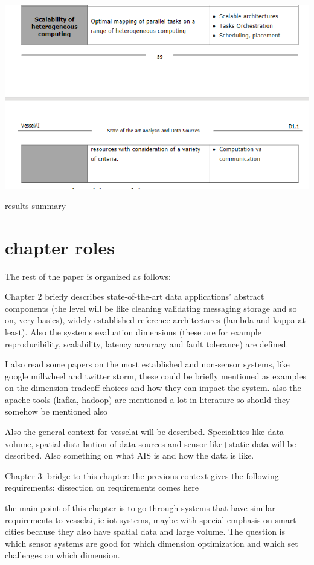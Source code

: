 \includegraphics[scale=0.8]{hpciotchallengefromd11.png}

results summary

\section{chapter roles}
The rest of the paper is organized as follows: 

Chapter 2 briefly describes state-of-the-art data applications' abstract components (the level will be like cleaning validating messaging storage and so on, very basics), widely established reference architectures (lambda and kappa at least). Also the systems evaluation dimensions (these are for example reproducibility, scalability, latency accuracy and fault tolerance) are defined. 

I also read some papers on the most established and non-sensor systems, like google millwheel and twitter storm, these could be briefly mentioned as examples on the dimension tradeoff choices and how they can impact the system. also the apache tools (kafka, hadoop) are mentioned a lot in literature so should they somehow be mentioned also

Also the general context for vesselai will be described. Specialities like data volume, spatial distribution of data sources and sensor-like+static data will be described. Also something on what AIS is and how the data is like. 

Chapter 3: bridge to this chapter: the previous context gives the following requirements: dissection on requirements comes here

the main point of this chapter is to go through systems that have similar requirements to vesselai, ie iot systems, maybe with special emphasis on smart cities because they also have spatial data and large volume. The question is which sensor systems are good for which dimension optimization and which set challenges on which dimension.

